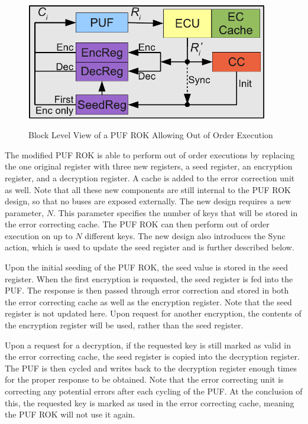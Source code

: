 \begin{figure}[!ht]
\includegraphics[width=400px]{images/rok_socreg.pdf}
\label{fig:rok}
\caption{Block Level View of a PUF ROK Allowing Out of Order Execution}
\end{figure}
\FloatBarrier

The modified PUF ROK is able to perform out of order executions by replacing the one original register with three
new registers, a seed register, an encryption register, and a decryption register. A cache is added to the error
correction unit as well. Note that all these new components are still internal to the PUF ROK design, so that no
buses are exposed externally.
The new design requires a new parameter, $N$. This parameter specifies the number of keys that will be stored in
the error correcting cache. The PUF ROK can then perform out of order execution on up to $N$ different keys.
The new design also introduces the Sync action, which is used to update the seed register and is further described
below.

Upon the initial seeding of the PUF ROK, the seed value is stored in the seed register. When the first encryption
is requested, the seed register is fed into the PUF. The response is then passed through error correction and stored
in both the error correcting cache as well as the encryption register. Note that the seed register is not updated here.
Upon request for another encryption, the contents of the encryption register will be used, rather than the seed register.

Upon a request for a decryption, if the requested key is still marked as valid in the error correcting cache,
the seed register is copied into the decryption register. The PUF is then cycled
and writes back to the decryption register enough times for the proper response to be obtained. Note that the
error correcting unit is correcting any potential errors after each cycling of the PUF. At the conclusion of this, the
requested key is marked as used in the error correcting cache, meaning the PUF ROK will not use it again.

